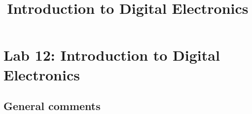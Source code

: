 \documentclass{article}
\title{Introduction to Digital Electronics}
\begin{document}
\maketitle

\section{Lab 12: Introduction to Digital Electronics}

\subsection*{General comments}

\begin{itemize}
\end{itemize}
\end{document}
